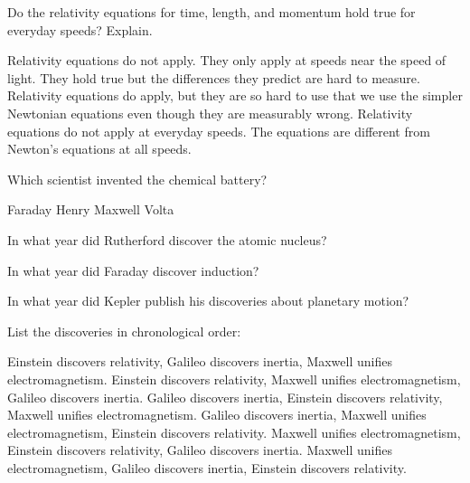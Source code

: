 \documentclass{exam}
\begin{document}
\begin{questions}
\question Do the relativity equations for time, length, and momentum hold true for everyday speeds? Explain.
\begin{choices}
  \choice Relativity equations do not apply. They only apply at speeds near the speed of light.
  \choice They hold true but the differences they predict are hard to measure.
  \choice Relativity equations do apply, but they are so hard to use that we use the simpler Newtonian equations even though they are measurably wrong.
  \choice Relativity equations do not apply at everyday speeds. The equations are different from Newton's equations at all speeds.
\end{choices}
\vfill{}

\newpage{}

\question Which scientist invented the chemical battery?
\begin{choices}
  \choice Faraday
  \choice Henry
  \choice Maxwell
  \choice Volta
\end{choices}
\vfill{}

\question In what year did Rutherford discover the atomic nucleus?
\begin{choices}
\end{choices}
\vfill{}

\question In what year did Faraday discover induction?
\begin{choices}
\end{choices}
\vfill{}

\question In what year did Kepler publish his discoveries about planetary motion?
\begin{choices}
\end{choices}
\vfill{}

\question List the discoveries in chronological order:
\begin{choices}
  \choice Einstein discovers relativity, Galileo discovers inertia, Maxwell unifies electromagnetism. 
  \choice Einstein discovers relativity, Maxwell unifies electromagnetism, Galileo discovers inertia. 
  \choice Galileo discovers inertia, Einstein discovers relativity, Maxwell unifies electromagnetism. 
  \choice Galileo discovers inertia, Maxwell unifies electromagnetism, Einstein discovers relativity.
  \choice Maxwell unifies electromagnetism, Einstein discovers relativity, Galileo discovers inertia. 
  \choice Maxwell unifies electromagnetism, Galileo discovers inertia, Einstein discovers relativity.
\end{choices}

\end{questions}
\end{document}
